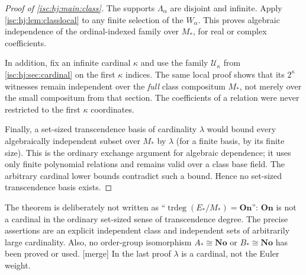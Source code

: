\documentclass[11pt,letterpaper]{article}
\theoremstyle{definition}
\theoremstyle{remark}
\newcommand{\No}{\mathbf{No}}
\newcommand{\On}{\mathbf{On}}
\newcommand{\trdeg}{\operatorname{trdeg}}
\newcommand{\mtag}{\textup{[merge]}}%
\numberwithin{equation}{section}
\begin{document}
\begin{proof}[Proof of \cref{isc:hj:main:class}]
The supports $\Lambda_\alpha$ are disjoint and infinite. Apply
\cref{isc:hj:lem:classlocal} to any finite selection of the $W_\alpha$.
This proves algebraic independence of the ordinal-indexed family over
$M_*$, for real or complex coefficients.

In addition, fix an infinite cardinal $\kappa$ and use the family
$\mathcal U_\kappa$ from \cref{isc:hj:sec:cardinal} on the first $\kappa$
indices. The same local proof shows that its $2^\kappa$ witnesses remain
independent over the \emph{full} class compositum $M_*$, not merely
over the small compositum from that section. The coefficients of a
relation were never restricted to the first $\kappa$ coordinates.

Finally, a set-sized transcendence basis of cardinality $\lambda$ would
bound every algebraically independent subset over $M_*$ by $\lambda$
(for a finite basis, by its finite size). This is the ordinary exchange
argument for algebraic dependence; it uses only finite polynomial
relations and remains valid over a class base field. The arbitrary
cardinal lower bounds contradict such a bound. Hence no set-sized
transcendence basis exists.
\end{proof}

The theorem is deliberately not written as
``$\trdeg(E_*/M_*)=\On$'': $\On$ is not a cardinal in the ordinary
set-sized sense of transcendence degree. The precise assertions are an
explicit independent class and independent sets of arbitrarily large
cardinality. Also, no order-group isomorphism $A_*\cong\No$ or
$B_*\cong\No$ has been proved or used.
\mtag{} In the last proof $\lambda$ is a cardinal, not the Euler weight.
\end{document}
